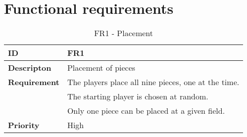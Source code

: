 \section{Functional requirements}



\begin{table}[h!]
\begin{tabular}{ | p{90pt} | p{270pt}  |}
\hline
\bf ID &  FR1  \\ \hline
\bf Descripton & Placement of pieces \\ \hline 
\bf Requirement & The players place all nine pieces, one at the time.  \\   
& The starting player is chosen at random. \\ 
& Only one piece can be placed at a given field. \\ \hline
\bf Priority & High \\ \hline

\end{tabular}
\caption{FR1 - Placement}
\end{table}


\pagebreak



